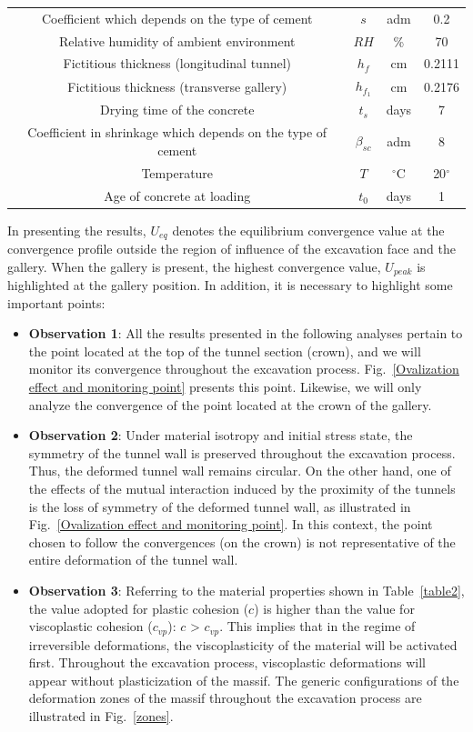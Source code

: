 \documentclass[a4paper,fleqn]{cas-sc}
\begin{document}
\begin{table}
\begin{tabular}{c c c c}
		Coefficient which depends on the type of cement & $s$ & adm & 0.2 \\
		Relative humidity of ambient environment & $RH$ & \% & 70 \\
		Fictitious thickness (longitudinal tunnel) & $h_f$ & cm & 0.2111 \\
		Fictitious thickness (transverse gallery) & $h_{f_1}$ & cm & 0.2176 \\
		Drying time of the concrete & $t_s$ & days & 7 \\
		Coefficient in shrinkage which depends on the type of cement & $\beta_{sc}$ & adm & 8 \\
		Temperature & $T$ & $^\circ$C & 20$^\circ$ \\
		Age of concrete at loading & $t_0$ & days & 1 \\
		\hline
	\end{tabular}
	\normalsize
\end{table}
\FloatBarrier
In presenting the results, $U_{eq}$ denotes the equilibrium convergence value at the convergence profile outside the region of influence of the excavation face and the gallery. When the gallery is present, the highest convergence value, $U_{peak}$ is highlighted at the gallery position. In addition, it is necessary to highlight some important points:
\begin{itemize}[]
	\item \textbf{Observation 1}: All the results presented in the following analyses pertain to the point located at the top of the tunnel section (crown), and we will monitor its convergence throughout the excavation process. Fig.~\ref{Ovalization effect and monitoring point} presents this point. Likewise, we will only analyze the convergence of the point located at the crown of the gallery. 
	\item \textbf{Observation 2}: Under material isotropy and initial stress state, the symmetry of the tunnel wall is preserved throughout the excavation process. Thus, the deformed tunnel wall remains circular. On the other hand, one of the effects of the mutual interaction induced by the proximity of the tunnels is the loss of symmetry of the deformed tunnel wall, as illustrated in Fig.~\ref{Ovalization effect and monitoring point}. In this context, the point chosen to follow the convergences (on the crown) is not representative of the entire deformation of the tunnel wall. 
	\item \textbf{Observation 3}: Referring to the material properties shown in Table~\ref{table2}, the value adopted for plastic cohesion ($c$) is higher than the value for viscoplastic cohesion ($c_{vp}$): $c$ > $c_{vp}$. This implies that in the regime of irreversible deformations, the viscoplasticity of the material will be activated first. Throughout the excavation process, viscoplastic deformations will appear without plasticization of the massif. The generic configurations of the deformation zones of the massif throughout the excavation process are illustrated in Fig.~\ref{zones}.
\end{itemize}
\end{document}
